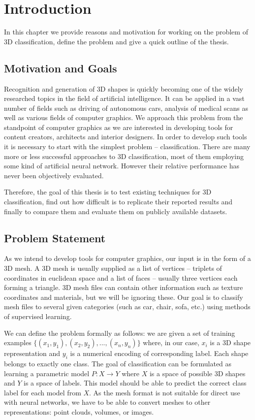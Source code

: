 \chapter{Introduction}
\label{sec:chap1}
In this chapter we provide reasons and motivation for working on the problem of 3D classification, define the problem and give a quick outline of the thesis.

\section{Motivation and Goals}
Recognition and generation of 3D shapes is quickly becoming one of the widely researched topics in the field of artificial intelligence. It can be applied in a vast number of fields such as driving of autonomous cars, analysis of medical scans as well as various fields of computer graphics. We approach this problem from the standpoint of computer graphics as we are interested in developing tools for content creators, architects and interior designers. In order to develop such tools it is necessary to start with the simplest problem -- classification. 
There are many more or less successful approaches to 3D classification, most of them employing some kind of artificial neural network. However their relative performance has never been objectively evaluated.\par
Therefore, the goal of this thesis is to test existing techniques for 3D classification, find out how difficult is to replicate their reported results and finally to compare them and evaluate them on publicly available datasets.
\section{Problem Statement}
As we intend to develop tools for computer graphics, our input is in the form of a 3D mesh. A 3D mesh is usually supplied as a list of vertices -- triplets of coordinates in euclidean space and a list of faces -- usually three vertices each forming a triangle. 3D mesh files can contain other information such as texture coordinates and materials, but we will be ignoring these. Our goal is to classify mesh files to several given categories (such as car, chair, sofa, etc.) using methods of supervised learning.\par
We can define the problem formally as follows: we are given a set of training examples $\{(x_1,y_1),(x_2,y_2), ..., (x_n,y_n)\}$ where, in our case, $x_i$ is a 3D shape representation and $y_i$ is a numerical encoding of corresponding label. Each shape belongs to exactly one class. The goal of classification can be formulated as learning a parametric model $P:X \rightarrow Y$ where $X$ is a space of possible 3D shapes and $Y$ is a space of labels. This model should be able to predict the correct class label for each model from $X$.
As the mesh format is not suitable for direct use with neural networks, we have to be able to convert meshes to other representations: point clouds, volumes, or images.
